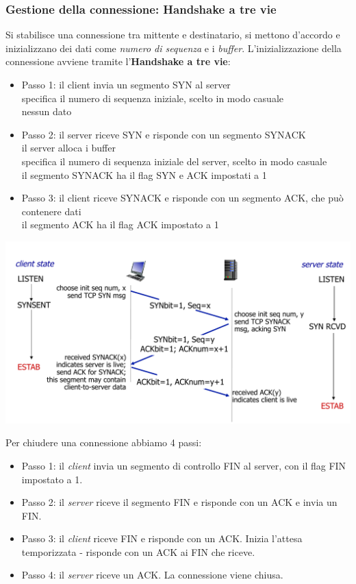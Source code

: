 \subsubsection*{Gestione della connessione: Handshake a tre vie}
Si stabilisce una connessione tra mittente e destinatario, si mettono d'accordo e inizializzano dei dati come \textit{numero di sequenza} e i \textit{buffer}.
L'inizializzazione della connessione avviene tramite l'\textbf{Handshake a tre vie}:
\begin{itemize}
  \item Passo 1: il client invia un segmento SYN al server \\
      specifica il numero di sequenza iniziale, scelto in modo casuale \\
      nessun dato
  \item Passo 2:  il server riceve SYN e risponde con un segmento SYNACK \\
      il server alloca i buffer \\
      specifica il numero di sequenza iniziale del server, scelto in modo casuale \\
      il segmento SYNACK ha il flag SYN e ACK impostati a 1
  \item Passo 3:  il client riceve SYNACK e risponde con un segmento ACK, che può contenere dati \\
      il segmento ACK ha il flag ACK impostato a 1
\end{itemize}

\begin{center}
\includegraphics[width=\textwidth]{./img/handshake3vie.png}
\end{center}

Per chiudere una connessione abbiamo 4 passi:
\begin{itemize}
  \item Passo 1: il \textit{client} invia un segmento di controllo FIN al server, con il flag FIN impostato a 1.
  \item Passo 2: il \textit{server} riceve il segmento FIN e risponde con un ACK e invia un FIN.
  \item Passo 3: il \textit{client} riceve FIN e risponde con un ACK. Inizia l’attesa temporizzata - risponde con un ACK ai FIN che riceve.
  \item Passo 4: il \textit{server} riceve un ACK. La connessione viene chiusa.
\end{itemize}

